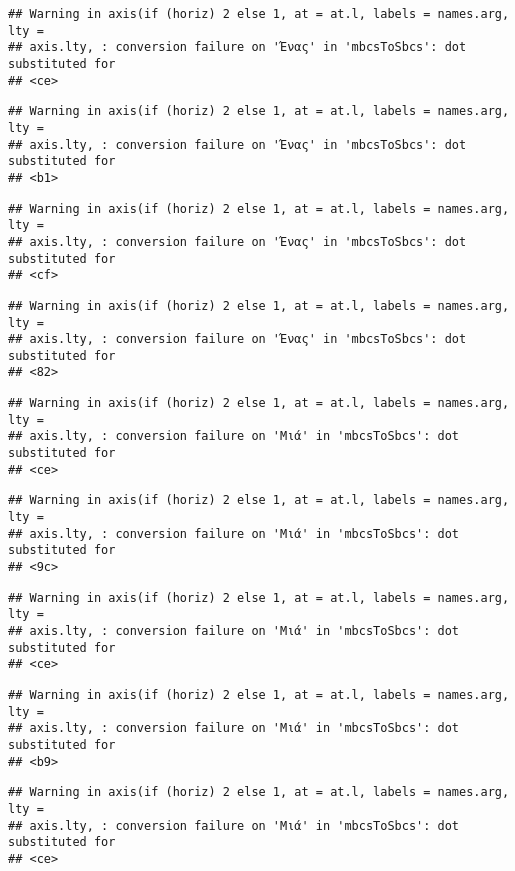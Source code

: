 \documentclass[
]{article}
\begin{document}
\begin{verbatim}
## Warning in axis(if (horiz) 2 else 1, at = at.l, labels = names.arg, lty =
## axis.lty, : conversion failure on 'Ένας' in 'mbcsToSbcs': dot substituted for
## <ce>
\end{verbatim}

\begin{verbatim}
## Warning in axis(if (horiz) 2 else 1, at = at.l, labels = names.arg, lty =
## axis.lty, : conversion failure on 'Ένας' in 'mbcsToSbcs': dot substituted for
## <b1>
\end{verbatim}

\begin{verbatim}
## Warning in axis(if (horiz) 2 else 1, at = at.l, labels = names.arg, lty =
## axis.lty, : conversion failure on 'Ένας' in 'mbcsToSbcs': dot substituted for
## <cf>
\end{verbatim}

\begin{verbatim}
## Warning in axis(if (horiz) 2 else 1, at = at.l, labels = names.arg, lty =
## axis.lty, : conversion failure on 'Ένας' in 'mbcsToSbcs': dot substituted for
## <82>
\end{verbatim}

\begin{verbatim}
## Warning in axis(if (horiz) 2 else 1, at = at.l, labels = names.arg, lty =
## axis.lty, : conversion failure on 'Μιά' in 'mbcsToSbcs': dot substituted for
## <ce>
\end{verbatim}

\begin{verbatim}
## Warning in axis(if (horiz) 2 else 1, at = at.l, labels = names.arg, lty =
## axis.lty, : conversion failure on 'Μιά' in 'mbcsToSbcs': dot substituted for
## <9c>
\end{verbatim}

\begin{verbatim}
## Warning in axis(if (horiz) 2 else 1, at = at.l, labels = names.arg, lty =
## axis.lty, : conversion failure on 'Μιά' in 'mbcsToSbcs': dot substituted for
## <ce>
\end{verbatim}

\begin{verbatim}
## Warning in axis(if (horiz) 2 else 1, at = at.l, labels = names.arg, lty =
## axis.lty, : conversion failure on 'Μιά' in 'mbcsToSbcs': dot substituted for
## <b9>
\end{verbatim}

\begin{verbatim}
## Warning in axis(if (horiz) 2 else 1, at = at.l, labels = names.arg, lty =
## axis.lty, : conversion failure on 'Μιά' in 'mbcsToSbcs': dot substituted for
## <ce>
\end{verbatim}
\end{document}
